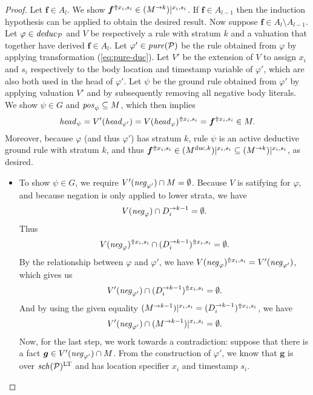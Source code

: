\documentclass{tlp}
\newcommand{\ded}{\mathcal{P}}
\newcommand{\fc}{\boldsymbol{f}}
\newcommand{\fcB}{\boldsymbol{g}}
\newcommand{\rl}{\varphi}
\newcommand{\head}[1]{\fname{head}_{#1}}
\newcommand{\bpos}[1]{\fname{pos}_{#1}}
\newcommand{\bneg}[1]{\fname{neg}_{#1}}
\newcommand{\schof}[1]{\fname{sch}(#1)}
\newcommand{\grl}{\psi}
\newcommand{\sh}[1]{(#1)}
\newcommand{\toloct}[1]{#1^{\mathrm{LT}}}
\newcommand{\addlt}[3]{#1^{\Uparrow#2,#3}}
\newcommand{\projlt}[3]{#1|^{#2,#3}}
\newcommand{\shprojlt}[3]{\projlt{\sh{#1}}{#2}{#3}}
\newcommand{\shaddlt}[3]{\addlt{\sh{#1}}{#2}{#3}}
\newcommand{\pure}[1]{\fname{pure}(#1)}
\newcommand{\deduc}[1]{\fname{deduc}_{#1}}
\newcommand{\grded}{G}
\begin{document}
\begin{appendix}
\begin{proof}
Let $\fc\in A_{l}$. We show $\addlt{\fc}{x_{i}}{s_{i}}\in\shprojlt{\strat Mk}{x_{i}}{s_{i}}$.
If $\fc\in A_{l-1}$ then the induction hypothesis can be applied
to obtain the desired result. Now suppose $\fc\in A_{l}\setminus A_{l-1}$.
Let $\rl\in\deduc{\ded}$ and $V$ be respectively a rule with stratum
$k$ and a valuation that together have derived $\fc\in A_{l}$. Let
$\rl'\in\pure{\ded}$ be the rule obtained from $\rl$ by applying
transformation (\ref{eq:pure-duc}). Let $V'$ be the extension of
$V$ to assign $x_{i}$ and $s_{i}$ respectively to the body location
and timestamp variable of $\rl'$, which are also both used in the
head of $\rl'$. Let $\grl$ be the ground rule obtained from $\rl'$
by applying valuation $V'$ and by subsequently removing all negative
body literals. We show $\grl\in\grded$ and $\bpos{\grl}\subseteq M$,
which then implies 
\[
\head{\grl}=V'(\head{\rl'})=\addlt{V(\head{\rl})}{x_{i}}{s_{i}}=\addlt{\fc}{x_{i}}{s_{i}}\in M.
\]
Moreover, because $\rl$ (and thus $\rl'$) has stratum $k$, rule
$\grl$ is an active deductive ground rule with stratum $k$, and
thus $\addlt{\fc}{x_{i}}{s_{i}}\in\shprojlt{\duc Mk}{x_{i}}{s_{i}}\subseteq\shprojlt{\strat Mk}{x_{i}}{s_{i}}$,
as desired.
\begin{itemize}
\item To show $\grl\in\grded$, we require $V'(\bneg{\rl'})\cap M=\emptyset$.
Because $V$ is satifying for $\rl$, and because negation is only
applied to lower strata, we have 
\[
V(\bneg{\rl})\cap\strat{D_{i}}{k-1}=\emptyset.
\]
Thus
\[
\addlt{V(\bneg{\rl})}{x_{i}}{s_{i}}\cap\shaddlt{\strat{D_{i}}{k-1}}{x_{i}}{s_{i}}=\emptyset.
\]
By the relationship between $\rl$ and $\rl'$, we have $\addlt{V(\bneg{\rl})}{x_{i}}{s_{i}}=V'(\bneg{\rl'})$,
which gives us 
\[
V'(\bneg{\rl'})\cap\shaddlt{\strat{D_{i}}{k-1}}{x_{i}}{s_{i}}=\emptyset.
\]
And by using the given equality $\shprojlt{\strat M{k-1}}{x_{i}}{s_{i}}=\shaddlt{\strat{D_{i}}{k-1}}{x_{i}}{s_{i}}$,
we have 
\[
V'(\bneg{\rl'})\cap\shprojlt{\strat M{k-1}}{x_{i}}{s_{i}}=\emptyset.
\]
Now, for the last step, we work towards a contradiction: suppose that
there is a fact $\fcB\in V'(\bneg{\rl'})\cap M$. From the construction
of $\rl'$, we know that $\fcB$ is over $\toloct{\schof{\ded}}$
and has location specifier $x_{i}$ and timestamp $s_{i}$. 


\end{itemize}
\end{proof}
\end{appendix}
\end{document}
